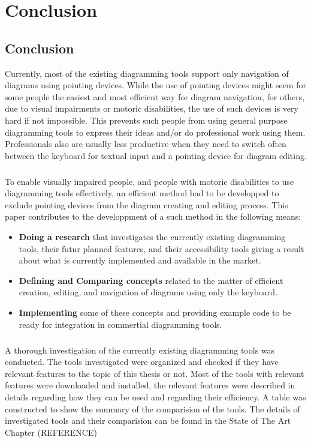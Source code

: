 \chapter{Conclusion}\label{chap:concl}
\beginchapter

\section{Conclusion}
Currently, most of the existing diagramming tools support only navigation of diagrams using pointing devices. While the use of pointing devices might seem for some people the easiest and most efficient way for diagram navigation, for others, due to visual impairments or motoric disabilities, the use of such devices is very hard if not impossible. This prevents such people from using general purpose diagramming tools to express their ideas and/or do professional work using them. Professionals also are usually less productive when they need to switch often between the keyboard for textual input and a pointing device for diagram editing. 

\paragraph{}
To enable visually impaired people, and people with motoric disabilities to use diagramming tools effectively, an efficient method had to be developped to exclude pointing devices from the diagram creating and editing process. This paper contributes to the developpment of a such method in the following means:
\begin{itemize}
\item {\bf Doing a research} that investigates the currently existing diagramming tools, their futur planned features, and their accessibility tools giving a result about what is currently implemented and available in the market.
\item {\bf Defining and Comparing concepts} related to the matter of efficient creation, editing, and navigation of diagrams using only the keyboard.
\item {\bf Implementing} some of these concepts and providing example code to be ready for integration in commertial diagramming tools.
\end{itemize}

\paragraph{}
A thorough investigation of the currently existing diagramming tools was conducted. The tools investigated were organized and checked if they have relevant features to the topic of this thesis or not. Most of the tools with relevant features were downloaded and installed, the relevant features were described in details regarding how they can be used and regarding their efficiency. A table was constructed to show the summary of the comparision of the tools. The details of investigated tools and their comparision can be found in the State of The Art Chapter (REFERENCE)

